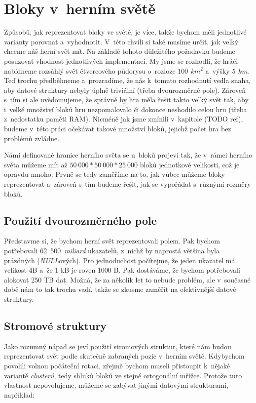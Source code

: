 
\section{Bloky v~herním světě}
\label{sec:blocksWorld}

Způsobů, jak reprezentovat bloky ve světě, je více, takže bychom měli jednotlivé varianty porovnat a~vyhodnotit. V~této chvíli si také musíme určit, jak velký chceme náš herní svět mít. Na základě tohoto důležitého požadavku budeme posuzovat vhodnost jednotlivých implementací. My jsme se rozhodli, že hráči nabídneme rozsáhlý svět čtvercového půdorysu o~rozloze $100\,\ km^2$ a~výšky $5\,\ km$. Teď trochu předběhneme a~prozradíme, že nás k~tomuto rozhodnutí vedla snaha, aby datové struktury nebyly úplně triviální (třeba dvourozměrné pole). Zároveň s~tím si ale uvědomujeme, že správně by hra měla řešit takto velký svět tak, aby i~velké množství bloků hru nezpomalovalo či dokonce neshodilo celou hru (třeba z~nedostatku paměti RAM). Nicméně jak jsme zmínili v~kapitole (TODO ref), budeme v~této práci očekávat takové množství bloků, jejichž počet hra bez problémů zvládne.

Námi definované hranice herního světa se u~bloků projeví tak, že v~rámci herního světa můžeme mít až  $50~000 * 50~000 * 25~000$ bloků jednotkové velikosti, což je opravdu mnoho. Prvně se tedy zaměříme na to, jak vůbec můžeme bloky reprezentovat a~zároveň s~tím budeme řešit, jak se vypořádat s~různými rozměry bloků.

\subsection{Použití dvourozměrného pole}

Představme si, že bychom herní svět reprezentovali polem. Pak bychom potřebovali 62~500~\textit{miliard} ukazatelů, z~nichž by naprostá většina byla prázdných (\textit{NULL}ových). Pro jednoduchost počítejme, že jeden ukazatel má velikost 4B a~že 1 kB je roven 1000 B. Pak dostáváme, že bychom potřebovali alokovat 250 TB dat. Možná, že za několik let to nebude problém, ale v~současné době nám to tak trochu vadí, takže se zkusme zaměřit na efektivnější datové struktury.

\subsection{Stromové struktury}

Jako rozumný nápad se jeví použití stromových struktur, které nám budou reprezentovat svět podle skutečně zabraných pozic v~herním světě. Kdybychom povolili volnou počáteční rotaci, zřejmě bychom museli přistoupit k~nějaké variantě \textit{clusterů}, tedy shluků bloků ve stejné ortogonální mřížce. Protože tuto vlastnost nepovolujeme, můžeme se zabývat jinými datovými strukturami, například:

